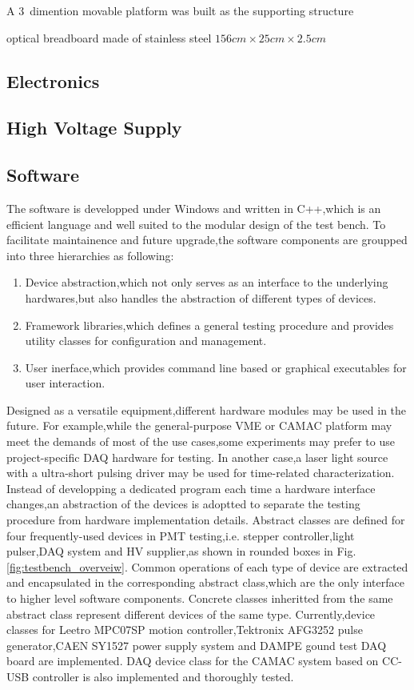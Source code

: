 \documentclass[preprint,5p,times]{elsarticle}
\begin{document}
A 3~dimention movable platform was built as the supporting structure

optical breadboard made of stainless steel $156cm\times25cm\times2.5cm$
\subsection{Electronics}
\label{sec:integrating_sphere}

\subsection{High Voltage Supply}
\label{sec:ref_pmt}

\subsection{Software}
\label{sec:software}
The software is developped under Windows and written in C++,which is an efficient language and well suited to the modular design of the test bench.
To facilitate maintainence and future upgrade,the software components are groupped into three hierarchies as following:
\begin{enumerate}
 \item Device abstraction,which not only serves as an interface to the underlying hardwares,but also handles the abstraction of different types of devices. 
 \item Framework libraries,which defines a general testing procedure and provides utility classes for configuration and management.
 \item User inerface,which provides command line based or graphical executables for user interaction. 
\end{enumerate}

Designed as a versatile equipment,different hardware modules may be used in the future.
For example,while the general-purpose VME or CAMAC platform may meet the demands of most of the use cases,some experiments may prefer to use project-specific DAQ hardware for testing.
In another case,a laser light source with a ultra-short pulsing driver may be used for time-related characterization.
Instead of developping a dedicated program each time a hardware interface changes,an abstraction of the devices is adoptted to separate the testing procedure from hardware implementation details.
Abstract classes are defined for four frequently-used devices in PMT testing,i.e. stepper controller,light pulser,DAQ system and HV supplier,as shown in rounded boxes in Fig.\ref{fig:testbench_overveiw}.
Common operations of each type of device are extracted and encapsulated in the corresponding abstract class,which are the only interface to higher level software components.
Concrete classes inheritted from the same abstract class represent different devices of the same type.
Currently,device classes for Leetro MPC07SP motion controller,Tektronix AFG3252 pulse generator,CAEN SY1527 power supply system and DAMPE gound test DAQ board are implemented.
DAQ device class for the CAMAC system based on CC-USB controller is also implemented and thoroughly tested.
\end{document}
